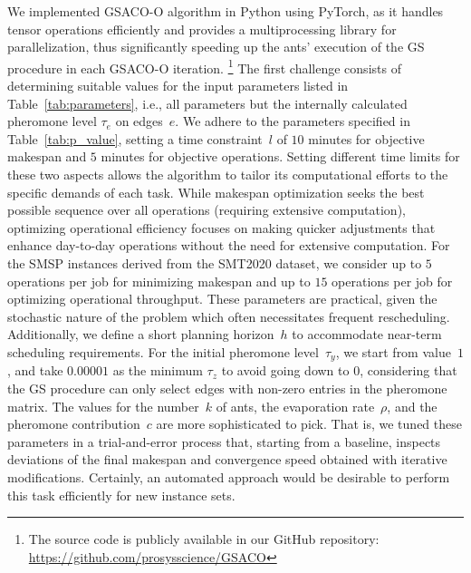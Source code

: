 We implemented GSACO-O algorithm in Python using PyTorch, as it handles tensor operations efficiently and provides a multiprocessing library for
parallelization, thus significantly speeding up the ants' execution of the GS procedure in each GSACO-O iteration.%
\footnote{The source code is publicly available in our GitHub repository:
	\url{https://github.com/prosysscience/GSACO}}
The first challenge consists of determining suitable values for the input
parameters listed in Table~\ref{tab:parameters}, i.e.,
all parameters but the internally calculated pheromone level $\tau_e$ on edges~$e$.
We adhere to the parameters specified in Table~\ref{tab:p_value}, setting a time constraint~$l$ of $10$ minutes for objective makespan and $5$ minutes for objective operations. 
Setting different time limits for these two aspects allows the algorithm to tailor its computational efforts to the specific demands of each task. While makespan optimization seeks the best possible sequence over all operations (requiring extensive computation), optimizing operational efficiency focuses on making quicker adjustments that enhance day-to-day operations without the need for extensive computation. 
For the SMSP instances derived from the SMT2020 dataset, we consider up to $5$ operations per job for minimizing makespan and up to $15$ operations per job for optimizing operational throughput. These parameters are practical, given the stochastic nature of the problem which often necessitates frequent rescheduling. Additionally, we define a short planning horizon~$h$ to accommodate near-term scheduling requirements.
For the initial pheromone level~$\tau_y$,
we start from value~$1$, and take $0.00001$ as the minimum $\tau_z$
to avoid going down to $0$, considering that the GS procedure can only
select edges with non-zero entries in the pheromone matrix.
The values for the number~$k$ of ants, the evaporation rate~$\rho$,
and the pheromone contribution~$c$ are more sophisticated to pick.
That is, we tuned these parameters in a trial-and-error process that,
starting from a baseline, inspects deviations of the final makespan and convergence speed obtained with iterative modifications.
Certainly, an automated approach would be desirable to
perform this task efficiently for new instance sets.%
%
